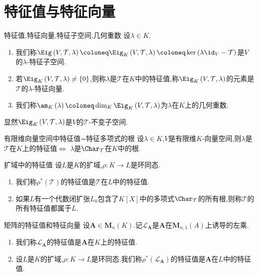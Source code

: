 \section{特征值与特征向量}

\begin{definition}{特征值,特征向量,特征子空间,几何重数}{}
	设$\lambda\in K$.
	\begin{enumerate}
		\item 我们称$\Eig\left(V,\mathcal{T},\lambda\right)\coloneq\Eig_{K}\left(V,\mathcal{T},\lambda\right)\coloneq\ker\left(\lambda\id_{V}-\mathcal{T}\right)$是$V$的$\lambda$-特征子空间.
		\item 若$\Eig_{K}\left(V,\mathcal{T},\lambda\right)\neq\left\{0\right\}$,则称$\lambda$是$\mathcal{T}$在$K$中的特征值,称$\Eig_{K}\left(V,\mathcal{T},\lambda\right)$的元素是$\mathcal{T}$的$\lambda$-特征向量.
		\item 我们称$\am_{K}\left(\lambda\right)\coloneq\dim_{K}\Eig_{K}\left(V,\mathcal{T},\lambda\right)$为$\lambda$在$K$上的几何重数.
	\end{enumerate}
\end{definition}

\begin{remark}{}{}
	显然$\Eig_{K}\left(V,\mathcal{T},\lambda\right)$是$V$的$\mathcal{T}$-不变子空间.
\end{remark}

\begin{proposition}{有限维向量空间中特征值=特征多项式的根}{}
	设$\lambda\in K$,$V$是有限维$K$-向量空间,则$\lambda$是$\mathcal{T}$在$K$上的特征值$\iff$ $\lambda$是$\Char_{\mathcal{T}}$在$K$中的根.
\end{proposition}

\begin{definition}{扩域中的特征值}{}
	设$L$是$K$的扩域,$\rho:K\to L$是环同态.
	\begin{enumerate}
		\item 我们称$\rho^{\ast}\left(\mathcal{T}\right)$的特征值是$\mathcal{T}$在$L$中的特征值.
		\item 如果$L$有一个代数闭扩张$L_{0}$包含了$K[X]$中的多项式$\Char_{\mathcal{T}}$的所有根,则称$\mathcal{T}$的所有特征值都属于$L$.
	\end{enumerate}
\end{definition}

\begin{definition}{矩阵的特征值和特征向量}{}
	设$\boldsymbol{A}\in\mathbf{M}_{n}\left(K\right)$.记$\mathcal{L}_{\boldsymbol{A}}$是$\boldsymbol{A}$在$\mathbf{M}_{n,1}\left(A\right)$上诱导的左乘.
	\begin{enumerate}
		\item 我们称$\mathcal{L}_{\boldsymbol{A}}$的特征值是$\boldsymbol{A}$在$K$上的特征值.
		\item 设$L$是$K$的扩域,$\rho:K\to L$是环同态.我们称$\rho^{\ast}\left(\mathcal{L}_{\boldsymbol{A}}\right)$的特征值是$\boldsymbol{A}$在$L$中的特征值.
	\end{enumerate}
\end{definition}


